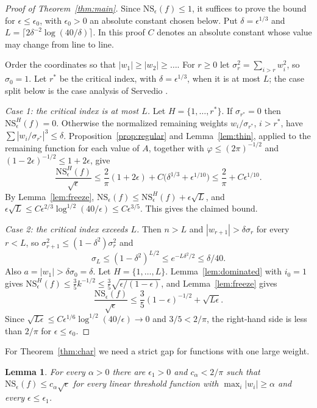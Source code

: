 \documentclass[11pt]{amsart}
\newtheorem{lemma}[theorem]{Lemma}
\theoremstyle{remark}
\numberwithin{equation}{section}
\begin{document}
\begin{proof}[Proof of Theorem~\ref{thm:main}]
Since $\mathrm{NS}_\epsilon(f)\le1$, it suffices to prove the bound for $\epsilon\le\epsilon_0$, with $\epsilon_0>0$ an absolute constant chosen below. Put $\delta=\epsilon^{1/3}$ and $L=\lceil2\delta^{-2}\log(40/\delta)\rceil$. In this proof $C$ denotes an absolute constant whose value may change from line to line.

Order the coordinates so that $|w_1|\ge|w_2|\ge\dots$. For $r\ge0$ let $\sigma_r^2=\sum_{i>r}w_i^2$, so $\sigma_0=1$. Let $r^*$ be the critical index, with $\delta=\epsilon^{1/3}$, when it is at most $L$; the case split below is the case analysis of Servedio \cite{Ser07}.

\emph{Case 1: the critical index is at most $L$.} Let $H=\{1,\dots,r^*\}$. If $\sigma_{r^*}=0$ then $\mathrm{NS}^H_\epsilon(f)=0$. Otherwise the normalized remaining weights $w_i/\sigma_{r^*}$, $i>r^*$, have $\sum|w_i/\sigma_{r^*}|^3\le\delta$. Proposition~\ref{prop:regular} and Lemma~\ref{lem:thin}, applied to the remaining function for each value of $A$, together with $\varphi\le(2\pi)^{-1/2}$ and $(1-2\epsilon)^{-1/2}\le1+2\epsilon$, give
\[
\frac{\mathrm{NS}^H_\epsilon(f)}{\sqrt\epsilon}\le\frac2\pi(1+2\epsilon)+C\bigl(\delta^{1/3}+\epsilon^{1/10}\bigr)\le\frac2\pi+C\epsilon^{1/10}.
\]
By Lemma~\ref{lem:freeze}, $\mathrm{NS}_\epsilon(f)\le \mathrm{NS}^H_\epsilon(f)+\epsilon\sqrt L$, and $\epsilon\sqrt L\le C\epsilon^{2/3}\log^{1/2}(40/\epsilon)\le C\epsilon^{3/5}$. This gives the claimed bound.

\emph{Case 2: the critical index exceeds $L$.} Then $n>L$ and $|w_{r+1}|>\delta\sigma_r$ for every $r<L$, so $\sigma_{r+1}^2\le(1-\delta^2)\sigma_r^2$ and
\[
\sigma_L\le(1-\delta^2)^{L/2}\le e^{-L\delta^2/2}\le\delta/40.
\]
Also $a=|w_1|>\delta\sigma_0=\delta$. Let $H=\{1,\dots,L\}$. Lemma~\ref{lem:dominated} with $i_0=1$ gives $\mathrm{NS}^H_\epsilon(f)\le\frac35k^{-1/2}\le\frac35\sqrt{\epsilon/(1-\epsilon)}$, and Lemma~\ref{lem:freeze} gives
\[
\frac{\mathrm{NS}_\epsilon(f)}{\sqrt\epsilon}\le\frac35(1-\epsilon)^{-1/2}+\sqrt{L\epsilon}.
\]
Since $\sqrt{L\epsilon}\le C\epsilon^{1/6}\log^{1/2}(40/\epsilon)\to0$ and $3/5<2/\pi$, the right-hand side is less than $2/\pi$ for $\epsilon\le\epsilon_0$.
\end{proof}

For Theorem~\ref{thm:char} we need a strict gap for functions with one large weight.

\begin{lemma}\label{lem:gap}
For every $\alpha>0$ there are $\epsilon_1>0$ and $c_\alpha<2/\pi$ such that $\mathrm{NS}_\epsilon(f)\le c_\alpha\sqrt\epsilon$ for every linear threshold function with $\max_i|w_i|\ge\alpha$ and every $\epsilon\le\epsilon_1$.
\end{lemma}
\end{document}
